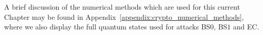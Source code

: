 A brief discussion of the numerical methods which are used for this current Chapter may be found in Appendix~\ref{appendix:crypto_numerical_methods}, where we also display the full quantum states used for attacks BS$0$, BS$1$ and EC.



